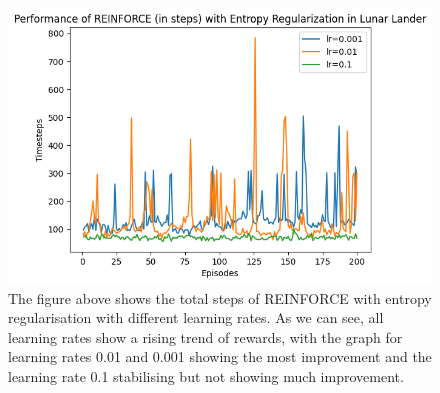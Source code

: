 \documentclass{article}
\begin{document}
\begin{figure}[htbp]
\centering
\includegraphics[width=0.9\linewidth]{Report/images/entropy_regularisation_2.png}
\caption{\label{fig:ReinforceEntropy Rewards}The figure above shows the total steps of REINFORCE with entropy regularisation with different learning rates. As we can see, all learning rates show a rising trend of rewards, with the graph for learning rates 0.01 and 0.001 showing the most improvement and the learning rate 0.1 stabilising but not showing much improvement. }
\end{figure}

  
\end{document}
